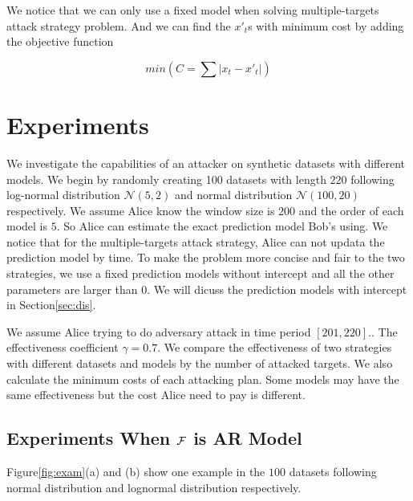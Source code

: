 \documentclass[journal]{IEEEtran}
\begin{document}
{We notice that we can only use a fixed model when solving multiple-targets attack strategy problem. And we can find the $x'_t$s with minimum cost by adding the objective function

\begin{equation}
min(C=\sum|x_t-x'_t|)
\end{equation}


}
\section{Experiments}

{\color{purple}

We investigate the capabilities of an attacker on synthetic datasets with different models. We begin by randomly creating 100 datasets with length $220$ following log-normal distribution $\mathcal{N}(5,2)$ and normal distribution $\mathcal{N}(100,20)$ respectively. We assume Alice know the window size is $200$ and the order of each model is $5$. So Alice can estimate the exact prediction model Bob's using. We notice that for the multiple-targets attack strategy, Alice can not updata the prediction model by time. To make the problem more concise and fair to the two strategies, we use a fixed prediction models without intercept and all the other parameters are larger than $0$. We will dicuss the prediction models with intercept in Section\ref{sec:dis}.

We assume Alice trying to do adversary attack in time period $[201, 220]$.. The effectiveness coefficient $\gamma=0.7$. We compare the effectiveness of two strategies with different datasets and models by the number of attacked targets. We also calculate the minimum costs of each attacking plan. Some models may have the same effectiveness but the cost Alice need to pay is different.


\subsection{Experiments When ${\cal F}$ is AR Model}
Figure\ref{fig:exam}(a) and (b) show one example in the $100$ datasets following normal distribution and lognormal distribution respectively.

\begin{figure*}[htbp!]
\centering
{}
\caption{Real example of $x_t$, $x'_t$, $z'_{B,t}$ and targets}
\label{fig:exam}
\end{figure*}

}
\end{document}
